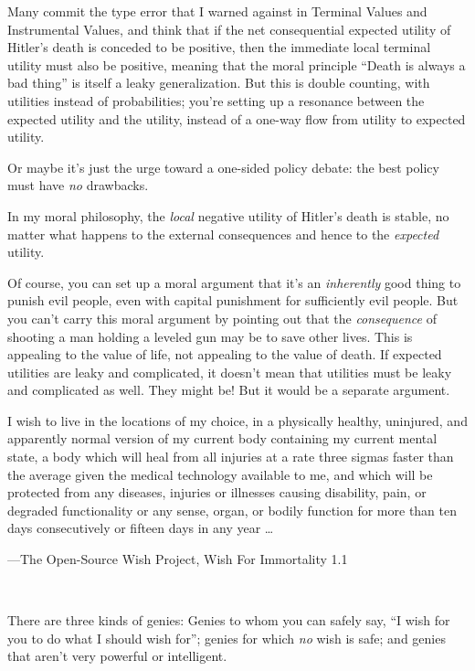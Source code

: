 {
 Many commit the type error that I warned against in Terminal
Values and Instrumental Values, and think that if the net consequential
expected utility of Hitler's death is conceded to be
positive, then the immediate local terminal utility must also be
positive, meaning that the moral principle ``Death is
always a bad thing'' is itself a leaky
generalization. But this is double counting, with utilities instead of
probabilities; you're setting up a resonance between
the expected utility and the utility, instead of a one-way flow from
utility to expected utility.}

{
 Or maybe it's just the urge toward a one-sided
policy debate: the best policy must have \textit{no} drawbacks.}

{
 In my moral philosophy, the \textit{local} negative utility of
Hitler's death is stable, no matter what happens to the
external consequences and hence to the \textit{expected} utility.}

{
 Of course, you can set up a moral argument that
it's an \textit{inherently} good thing to punish evil
people, even with capital punishment for sufficiently evil people. But
you can't carry this moral argument by pointing out
that the \textit{consequence} of shooting a man holding a leveled gun
may be to save other lives. This is appealing to the value of life, not
appealing to the value of death. If expected utilities are leaky and
complicated, it doesn't mean that utilities must be
leaky and complicated as well. They might be! But it would be a
separate argument.}

\myendsectiontext


{
 I wish to live in the locations of my choice, in a physically
healthy, uninjured, and apparently normal version of my current body
containing my current mental state, a body which will heal from all
injuries at a rate three sigmas faster than the average given the
medical technology available to me, and which will be protected from
any diseases, injuries or illnesses causing disability, pain, or
degraded functionality or any sense, organ, or bodily function for more
than ten days consecutively or fifteen days in any year \ldots}

{\raggedleft
 {}---The Open-Source Wish Project, Wish For Immortality 1.1
\par}


\bigskip

{
 ~}

{
 There are three kinds of genies: Genies to whom you can safely
say, ``I wish for you to do what I should wish
for''; genies for which \textit{no} wish is safe; and
genies that aren't very powerful or intelligent.}

